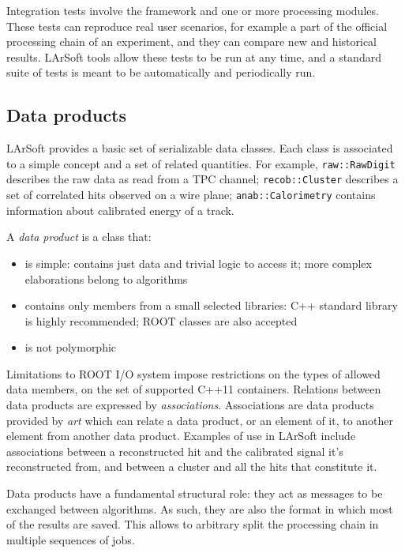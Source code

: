 Integration tests involve the framework and one or more processing
modules. These tests can reproduce real user scenarios, for example a
part of the official processing chain of an experiment, and they can
compare new and historical results. LArSoft tools allow these tests to
be run at any time, and a standard suite of tests is meant to be
automatically and periodically run.



\subsection{Data products}
\label{ssec:Development:DataProducts}

LArSoft provides a basic set of serializable data classes.
Each class is associated to a simple concept and a set of related quantities.
For example, \texttt{raw::RawDigit} describes the raw data as read from a TPC channel;
\texttt{recob::Cluster} describes a set of correlated hits observed on a wire plane;
\texttt{anab::Calorimetry} contains information about calibrated energy of a track.

A \emph{data product} is a class that:
\begin{itemize}
   \item is simple: contains just data and trivial logic to access it;
      more complex elaborations belong to algorithms
   \item contains only members from a small selected libraries:
      C++ standard library is highly recommended; ROOT classes are also accepted
   \item is not polymorphic
\end{itemize}

Limitations to ROOT I/O system impose restrictions on the types of allowed data members,
\eg on the set of supported C++11 containers.
Relations between data products are expressed by \emph{associations}.
Associations are data products provided by \emph{art}
which can relate a data product, or an element of it,
to another element from another data product.
Examples of use in LArSoft include associations between a
reconstructed hit and the calibrated signal it's reconstructed from, and
between a cluster and all the hits that constitute it.

Data products have a fundamental structural role:
they act as messages to be exchanged between algorithms.
As such, they are also the format in which most of the results are saved.
This allows to arbitrary split the processing chain in multiple sequences of jobs.


